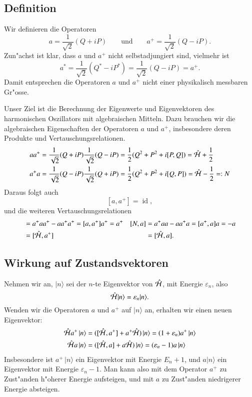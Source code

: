 \subsection{Definition}
Wir definieren die Operatoren
\[
a=\frac1{\sqrt{2}}(Q+iP)
\qquad\text{und}\qquad
a^+=\frac1{\sqrt{2}}(Q-iP).
\]
Zun"achst ist klar, dass $a$ und $a^+$ nicht selbstadjungiert sind,
vielmehr ist
\[
a^*=\frac1{\sqrt{2}}(Q^*-iP^*)=\frac1{\sqrt{2}}(Q-iP)=a^+.
\]
Damit entsprechen die Operatoren $a$ und $a^+$ nicht einer physikalisch
messbaren Gr"osse. 

Unser Ziel ist die Berechnung der Eigenwerte und Eigenvektoren
des harmonischen Oszillators mit algebraischen Mitteln. Dazu brauchen
wir die algebraischen Eigenschaften der Operatoren $a$ und $a^+$,
insbesondere deren Produkte und Vertauschungsrelationen.
\begin{align*}
aa^+
&=
\frac1{\sqrt{2}}(Q+iP)\frac1{\sqrt{2}}(Q-iP)
=
\frac12(Q^2+P^2+i[P,Q])
=
\hat{\cal H}+\frac12
\\
a^+a
&=
\frac1{\sqrt{2}}(Q-iP)\frac1{\sqrt{2}}(Q+iP)
=
\frac12(Q^2+P^2+i[Q,P])
=
\hat{\cal H}-\frac12=:N
\end{align*}
Daraus folgt auch
\[
[a,a^+]=\operatorname{id},
\]
und die weiteren Vertauschungsrelationen
\begin{align*}
[N,a^+]
&=a^+aa^+-aa^+a^+=[a,a^+]a^+=a^+
&
[N,a]
&=a^+aa-aa^+a=[a^+,a]a=-a
\\
&=[\hat{\cal H},a^+]
&
&=[\hat{\cal H}, a].
\end{align*}

\subsection{Wirkung auf Zustandsvektoren}
Nehmen wir an, $|n\rangle$ sei der $n$-te Eigenvektor von $\hat{\cal H}$,
mit Energie $\varepsilon_n$, also
\[
\hat{\cal H}|n\rangle = \varepsilon_n|n\rangle.
\]
Wenden wir die Operatoren $a$ und $a^+$ auf $|n\rangle$ an, erhalten
wir einen neuen Eigenvektor:
\begin{align*}
\hat{\cal H}a^+\,|n\rangle
&=
([\hat{\cal H}, a^+] + a^+\hat{\cal H})\,|n\rangle
=
(1 + \varepsilon_n)a^+\,|n\rangle
\\
\hat{\cal H}a\,|n\rangle
&=
([\hat{\cal H}, a] + a\hat{\cal H})\,|n\rangle
=
(\varepsilon_n - 1)a\,|n\rangle
\end{align*}
Insbesondere ist $a^+\,|n\rangle$ ein Eigenvektor mit Energie
$E_n+1$, und $a|n\rangle$ ein Eigenvektor mit Energie $\varepsilon_n-1$.
Man kann also mit dem Operator $a^+$ zu Zust"anden h"oherer Energie
aufsteigen, und mit $a$ zu Zust"anden niedrigerer Energie absteigen.

